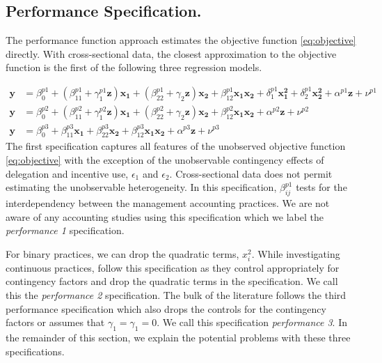 \documentclass[12pt]{article}
\begin{document}
\subsection{Performance Specification.}

The performance function approach estimates the objective function \eqref{eq:objective} directly. With cross-sectional data, the closest approximation to the objective function is the first of the following three regression models.  

\begin{align*}
\mathbf{y} &=  \beta^{p1}_0 + (\beta^{p1}_{11} + \gamma_1^{p1} \mathbf{z} )\mathbf{x_1} 
						+ (\beta_{22}^{p1} + \gamma_2 \mathbf{z} ) \mathbf{x_2} 
                        + \beta_{12}^{p1} \mathbf{x_1} \mathbf{x_2} 
                        + \delta_1^{p1} \mathbf{x^2_1} + \delta_2^{p1} \mathbf{x^2_2} 
                        + \alpha^{p1} \mathbf{z}
                        + \nu^{p1} \\
 \mathbf{y} &=  \beta^{p2}_0 + (\beta^{p2}_{11} + \gamma_1^{p2} \mathbf{z} )\mathbf{x_1} 
						+ (\beta_{22}^{p2} + \gamma_2 \mathbf{z} ) \mathbf{x_2} 
                        + \beta_{12}^{p2} \mathbf{x_1} \mathbf{x_2} 
                        + \alpha^{p2} \mathbf{z}
                        + \nu^{p2} \\
 \mathbf{y} &=  \beta^{p3}_0 + \beta^{p3}_{11} \mathbf{x_1} 
						+ \beta_{22}^{p3} \mathbf{x_2} 
                        + \beta_{12}^{p3} \mathbf{x_1} \mathbf{x_2} 
                        + \alpha^{p3} \mathbf{z}
                        + \nu^{p3}
\end{align*}
The first specification captures all features of the unobserved objective function \eqref{eq:objective} with the exception of the unobservable contingency effects of delegation and incentive use, $\epsilon_1$ and $\epsilon_2$. Cross-sectional data does not permit estimating the unobservable heterogeneity. In this specification, \(\beta_{ij}^{p1}\) tests for the interdependency between the management accounting practices. We are not aware of any accounting studies using this specification which we label the \emph{performance 1} specification. 

For binary practices, we can drop the quadratic terms, $x_i^2$.  While investigating continuous practices, \citet{Bedford2016,Bedford2018PerformanceFirms} follow this specification as they control appropriately for contingency factors and drop the quadratic terms in the specification. We call this the \emph{performance 2} specification. The bulk of the literature follows the third performance specification which also drops the controls for the contingency factors or assumes that $\gamma_1 = \gamma_1 = 0$. We call this specification \emph{performance 3}. In the remainder of this section, we explain the potential problems with these three specifications.
\end{document}
